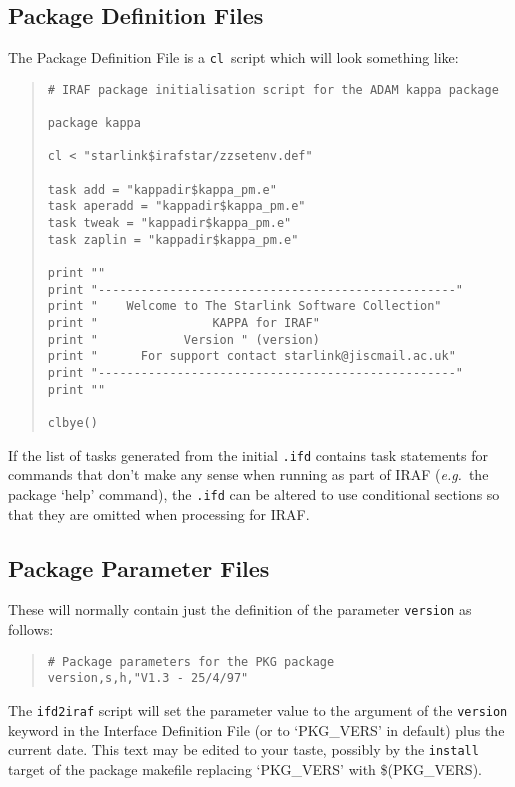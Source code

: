 \documentclass[twoside,11pt]{article}
\newcommand{\xref}[3]{#1}
\newcommand{\xlabel}[1]{}
\newcommand{\cl}{\texttt{cl}}
\begin{document}
\subsection{\xlabel{package_definition_files}Package Definition Files\label{pkg_def_files}}
The Package Definition File is a \cl\ script which will look something like:
\begin{quote} \begin{verbatim}
# IRAF package initialisation script for the ADAM kappa package

package kappa

cl < "starlink$irafstar/zzsetenv.def"

task add = "kappadir$kappa_pm.e"
task aperadd = "kappadir$kappa_pm.e"
task tweak = "kappadir$kappa_pm.e"
task zaplin = "kappadir$kappa_pm.e"

print ""
print "--------------------------------------------------"
print "    Welcome to The Starlink Software Collection"
print "                KAPPA for IRAF"
print "            Version " (version)
print "      For support contact starlink@jiscmail.ac.uk"
print "--------------------------------------------------"
print ""

clbye()
\end{verbatim} \end{quote}
If the list of tasks generated from the initial \texttt{.ifd} contains
task statements for commands that don't make any sense when running as part
of IRAF (\textit{e.g.}\ the package `help' command), the \texttt{.ifd} can be
altered to use
\xref{conditional sections}{ssn68}{conditional_sections}
so that they are omitted when processing for IRAF.

\subsection{\xlabel{package_parameter_files}Package Parameter Files}
These will normally contain just the definition of the parameter
\texttt{version} as follows:
\begin{quote} \begin{verbatim}
# Package parameters for the PKG package
version,s,h,"V1.3 - 25/4/97"
\end{verbatim} \end{quote}
The
\xref{\texttt{ifd2iraf}}{ssn68}{producing_iraf_files_from_an_ifd}
script will set the parameter value to the argument of
the
\xref{\texttt{version}}{ssn68}{version}
keyword in the Interface Definition File (or to `PKG\_VERS' in default) plus
the current date. This text may be edited to your taste, possibly by the
\texttt{install} target of the package makefile replacing `PKG\_VERS' with
\$(PKG\_VERS).
\end{document}
